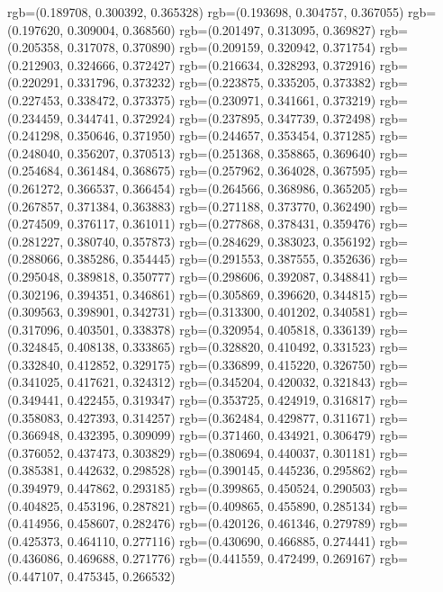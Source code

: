 {{{					rgb=(0.189708, 0.300392, 0.365328)
					rgb=(0.193698, 0.304757, 0.367055)
					rgb=(0.197620, 0.309004, 0.368560)
					rgb=(0.201497, 0.313095, 0.369827)
					rgb=(0.205358, 0.317078, 0.370890)
					rgb=(0.209159, 0.320942, 0.371754)
					rgb=(0.212903, 0.324666, 0.372427)
					rgb=(0.216634, 0.328293, 0.372916)
					rgb=(0.220291, 0.331796, 0.373232)
					rgb=(0.223875, 0.335205, 0.373382)
					rgb=(0.227453, 0.338472, 0.373375)
					rgb=(0.230971, 0.341661, 0.373219)
					rgb=(0.234459, 0.344741, 0.372924)
					rgb=(0.237895, 0.347739, 0.372498)
					rgb=(0.241298, 0.350646, 0.371950)
					rgb=(0.244657, 0.353454, 0.371285)
					rgb=(0.248040, 0.356207, 0.370513)
					rgb=(0.251368, 0.358865, 0.369640)
					rgb=(0.254684, 0.361484, 0.368675)
					rgb=(0.257962, 0.364028, 0.367595)
					rgb=(0.261272, 0.366537, 0.366454)
					rgb=(0.264566, 0.368986, 0.365205)
					rgb=(0.267857, 0.371384, 0.363883)
					rgb=(0.271188, 0.373770, 0.362490)
					rgb=(0.274509, 0.376117, 0.361011)
					rgb=(0.277868, 0.378431, 0.359476)
					rgb=(0.281227, 0.380740, 0.357873)
					rgb=(0.284629, 0.383023, 0.356192)
					rgb=(0.288066, 0.385286, 0.354445)
					rgb=(0.291553, 0.387555, 0.352636)
					rgb=(0.295048, 0.389818, 0.350777)
					rgb=(0.298606, 0.392087, 0.348841)
					rgb=(0.302196, 0.394351, 0.346861)
					rgb=(0.305869, 0.396620, 0.344815)
					rgb=(0.309563, 0.398901, 0.342731)
					rgb=(0.313300, 0.401202, 0.340581)
					rgb=(0.317096, 0.403501, 0.338378)
					rgb=(0.320954, 0.405818, 0.336139)
					rgb=(0.324845, 0.408138, 0.333865)
					rgb=(0.328820, 0.410492, 0.331523)
					rgb=(0.332840, 0.412852, 0.329175)
					rgb=(0.336899, 0.415220, 0.326750)
					rgb=(0.341025, 0.417621, 0.324312)
					rgb=(0.345204, 0.420032, 0.321843)
					rgb=(0.349441, 0.422455, 0.319347)
					rgb=(0.353725, 0.424919, 0.316817)
					rgb=(0.358083, 0.427393, 0.314257)
					rgb=(0.362484, 0.429877, 0.311671)
					rgb=(0.366948, 0.432395, 0.309099)
					rgb=(0.371460, 0.434921, 0.306479)
					rgb=(0.376052, 0.437473, 0.303829)
					rgb=(0.380694, 0.440037, 0.301181)
					rgb=(0.385381, 0.442632, 0.298528)
					rgb=(0.390145, 0.445236, 0.295862)
					rgb=(0.394979, 0.447862, 0.293185)
					rgb=(0.399865, 0.450524, 0.290503)
					rgb=(0.404825, 0.453196, 0.287821)
					rgb=(0.409865, 0.455890, 0.285134)
					rgb=(0.414956, 0.458607, 0.282476)
					rgb=(0.420126, 0.461346, 0.279789)
					rgb=(0.425373, 0.464110, 0.277116)
					rgb=(0.430690, 0.466885, 0.274441)
					rgb=(0.436086, 0.469688, 0.271776)
					rgb=(0.441559, 0.472499, 0.269167)
					rgb=(0.447107, 0.475345, 0.266532)
}}}
